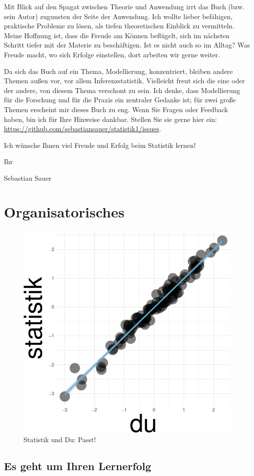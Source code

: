 \documentclass[
  letterpaper,
]{scrbook}
\theoremstyle{definition}
\theoremstyle{definition}
\theoremstyle{definition}
\theoremstyle{remark}
\begin{document}
Mit Blick auf den Spagat zwischen Theorie und Anwendung irrt das Buch
(bzw. sein Autor) zugunsten der Seite der Anwendung. Ich wollte lieber
befähigen, praktische Probleme zu lösen, als tiefen theoretischen
Einblick zu vermitteln. Meine Hoffnung ist, dass die Freude am Können
beflügelt, sich im nächsten Schritt tiefer mit der Materie zu
beschäftigen. Ist es nicht auch so im Alltag? Was Freude macht, wo sich
Erfolge einstellen, dort arbeiten wir gerne weiter.

Da sich das Buch auf ein Thema, Modellierung, konzentriert, bleiben
andere Themen außen vor, vor allem Inferenzstatistik. Vielleicht freut
sich die eine oder der andere, von diesem Thema verschont zu sein. Ich
denke, dass Modellierung für die Forschung und für die Praxis ein
zentraler Gedanke ist; für zwei große Themen erscheint mir dieses Buch
zu eng. Wenn Sie Fragen oder Feedback haben, bin ich für Ihre Hinweise
dankbar. Stellen Sie sie gerne hier ein:
\url{https://github.com/sebastiansauer/statistik1/issues}.

Ich wünsche Ihnen viel Freude und Erfolg beim Statistik lernen!

Ihr

Sebastian Sauer


\chapter{Organisatorisches}\label{organisatorisches}

\begin{figure}[H]

{\centering \includegraphics[width=0.33\linewidth,height=\textheight,keepaspectratio]{005-orga_files/figure-pdf/statistik-und-du-guter-fit-1.pdf}

}

\caption{Statistik und Du: Passt!}

\end{figure}%

\section{Es geht um Ihren Lernerfolg}\label{es-geht-um-ihren-lernerfolg}
\end{document}
